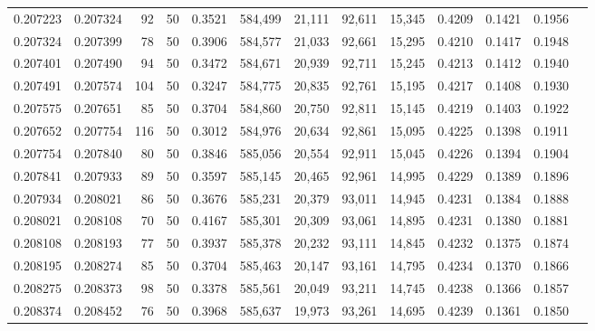 \begin{tabular}{rrrrrrrrrrrrr}
0.207223 & 0.207324 &    92 &  50 &                                     0.3521 & 584,499 &  21,111 &  92,611 &  15,345 & 0.4209 & 0.1421 & 0.1956 \\
0.207324 & 0.207399 &    78 &  50 &                                     0.3906 & 584,577 &  21,033 &  92,661 &  15,295 & 0.4210 & 0.1417 & 0.1948 \\
0.207401 & 0.207490 &    94 &  50 &                                     0.3472 & 584,671 &  20,939 &  92,711 &  15,245 & 0.4213 & 0.1412 & 0.1940 \\
0.207491 & 0.207574 &   104 &  50 &                                     0.3247 & 584,775 &  20,835 &  92,761 &  15,195 & 0.4217 & 0.1408 & 0.1930 \\
0.207575 & 0.207651 &    85 &  50 &                                     0.3704 & 584,860 &  20,750 &  92,811 &  15,145 & 0.4219 & 0.1403 & 0.1922 \\
0.207652 & 0.207754 &   116 &  50 &                                     0.3012 & 584,976 &  20,634 &  92,861 &  15,095 & 0.4225 & 0.1398 & 0.1911 \\
0.207754 & 0.207840 &    80 &  50 &                                     0.3846 & 585,056 &  20,554 &  92,911 &  15,045 & 0.4226 & 0.1394 & 0.1904 \\
0.207841 & 0.207933 &    89 &  50 &                                     0.3597 & 585,145 &  20,465 &  92,961 &  14,995 & 0.4229 & 0.1389 & 0.1896 \\
0.207934 & 0.208021 &    86 &  50 &                                     0.3676 & 585,231 &  20,379 &  93,011 &  14,945 & 0.4231 & 0.1384 & 0.1888 \\
0.208021 & 0.208108 &    70 &  50 &                                     0.4167 & 585,301 &  20,309 &  93,061 &  14,895 & 0.4231 & 0.1380 & 0.1881 \\
0.208108 & 0.208193 &    77 &  50 &                                     0.3937 & 585,378 &  20,232 &  93,111 &  14,845 & 0.4232 & 0.1375 & 0.1874 \\
0.208195 & 0.208274 &    85 &  50 &                                     0.3704 & 585,463 &  20,147 &  93,161 &  14,795 & 0.4234 & 0.1370 & 0.1866 \\
0.208275 & 0.208373 &    98 &  50 &                                     0.3378 & 585,561 &  20,049 &  93,211 &  14,745 & 0.4238 & 0.1366 & 0.1857 \\
0.208374 & 0.208452 &    76 &  50 &                                     0.3968 & 585,637 &  19,973 &  93,261 &  14,695 & 0.4239 & 0.1361 & 0.1850 \\

\end{tabular}

